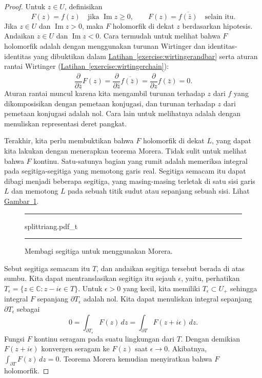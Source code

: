 \documentclass[12pt,openany]{book}
\renewcommand{\Im}{\operatorname{Im}}
\newcommand{\C}{{\mathbb{C}}}
\theoremstyle{plain}
\theoremstyle{remark}
\theoremstyle{definition}
\newenvironment{myfig}{%
\begin{figure}[h!t]
\noindent\rule{\textwidth}{0.5pt}\vspace{12pt}\par\centering}%
{\par\noindent\rule{\textwidth}{0.5pt}
\end{figure}}
\theoremstyle{exercise}
\theoremstyle{example}
\newcommand{\figureref}[1]{\hyperref[#1]{Gambar~\ref*{#1}}}
\newcommand{\exerciseref}[1]{\hyperref[#1]{Latihan~\ref*{#1}}}
\begin{document}
\begin{proof}
Untuk $z \in U$, definisikan
\begin{equation*}
F(z) =
f(z) \quad \text{jika } \Im z \geq 0,
\qquad
F(z) =
\overline{f(\bar{z})} \quad \text{selain itu} .
\end{equation*}
Jika $z \in U$ dan $\Im z > 0$, maka $F$ holomorfik di dekat $z$ berdasarkan hipotesis.
Andaikan $z \in U$ dan $\Im z < 0$.  Cara termudah untuk melihat bahwa $F$
holomorfik adalah dengan menggunakan turunan Wirtinger dan
identitas-identitas yang dibuktikan dalam \exerciseref{exercise:wirtingerandbar} serta
aturan rantai Wirtinger (\exerciseref{exercise:wirtingerchain}):
\begin{equation*}
\frac{\partial}{\partial \bar{z}}
F(z)
=
\frac{\partial}{\partial \bar{z}}
\overline{f(\bar{z})}
=
\overline{
\frac{\partial}{\partial z}
f(\bar{z})
}
=
0 .
\end{equation*}
Aturan rantai muncul karena kita mengambil turunan terhadap $z$ dari $f$
yang dikomposisikan dengan pemetaan konjugasi, dan turunan terhadap $z$ dari pemetaan
konjugasi adalah nol.
Cara lain untuk melihatnya adalah dengan menuliskan representasi deret pangkat.

Terakhir, kita perlu membuktikan bahwa $F$ holomorfik di dekat $L$,
yang dapat kita lakukan dengan menerapkan teorema Morera.
Tidak sulit untuk melihat bahwa $F$ kontinu.
Satu-satunya
bagian yang rumit adalah memeriksa integral pada
segitiga-segitiga yang memotong garis real.  Segitiga semacam itu dapat dibagi menjadi
beberapa segitiga, yang masing-masing terletak di satu sisi garis $L$ dan
memotong $L$ pada sebuah titik sudut atau sepanjang sebuah sisi.  Lihat \figureref{fig:splittriang}.

\begin{myfig}
{splittriang.pdf_t}
\caption{Membagi segitiga untuk menggunakan Morera.\label{fig:splittriang}}
\end{myfig}

Sebut segitiga semacam itu $T$, dan andaikan segitiga tersebut berada di atas sumbu.
Kita dapat mentranslasikan segitiga itu sejauh $\epsilon$, yaitu,
perhatikan $T_\epsilon = \{ z \in \C : z-i\epsilon \in T \}$.
Untuk $\epsilon > 0$ yang kecil, kita memiliki
$T_\epsilon \subset U_+$ sehingga
integral $F$ sepanjang $\partial T_\epsilon$
adalah nol.  Kita dapat menuliskan integral sepanjang $\partial T_\epsilon$
sebagai
\begin{equation*}
0 = \int_{\partial T_\epsilon} F(z) \, dz =
\int_{\partial T} F(z+i\epsilon) \, dz .
\end{equation*}
Fungsi $F$ kontinu seragam pada suatu lingkungan dari $T$.
Dengan demikian $F(z+i\epsilon)$ konvergen seragam ke $F(z)$ saat $\epsilon \to 0$.
Akibatnya, $\int_{\partial T} F(z) \, dz = 0$.
Teorema Morera kemudian menyiratkan bahwa $F$ holomorfik.
\end{proof}
\end{document}
